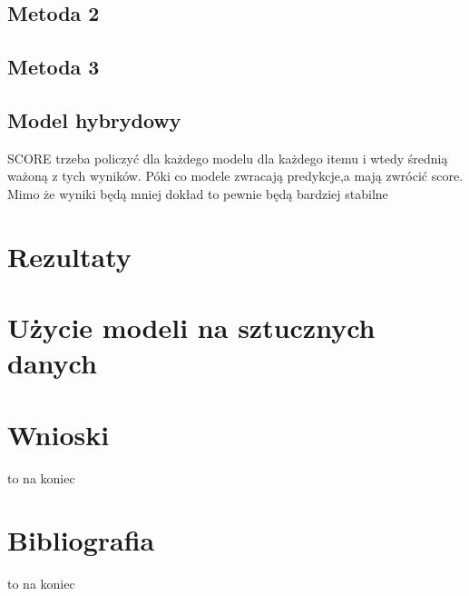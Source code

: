 \documentclass{article}
\begin{document}
\subsection{Metoda 2}
\subsection{Metoda 3}
\subsection{Model hybrydowy}
SCORE trzeba policzyć dla każdego modelu dla każdego itemu i wtedy średnią ważoną z tych wyników. Póki co modele zwracają predykcje,a mają zwrócić score. Mimo że wyniki będą mniej dokład to pewnie będą bardziej stabilne

\section{Rezultaty}
\section{Użycie modeli na sztucznych danych}
\section{Wnioski}
to na koniec
\section{Bibliografia}
to na koniec
\end{document}
